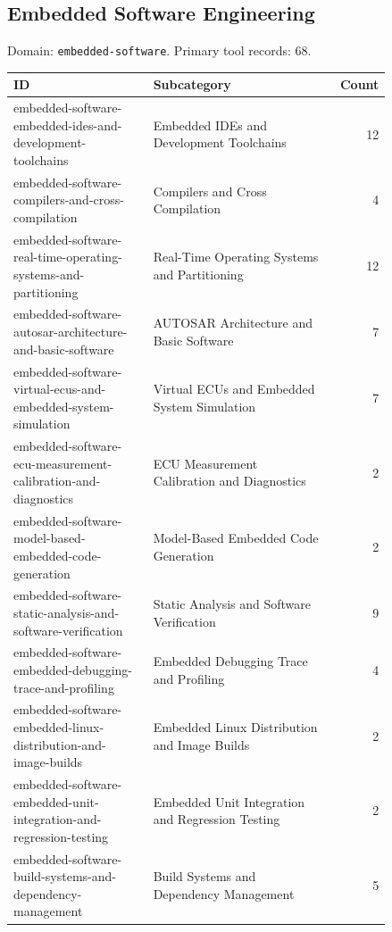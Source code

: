 \subsection{Embedded Software Engineering}
\noindent Domain: \texttt{embedded-software}. Primary tool records: 68.
\begin{longtable}{p{0.37\linewidth}p{0.47\linewidth}r}
ID & Subcategory & Count\\\hline\endhead
embedded-software-embedded-ides-and-development-toolchains & Embedded IDEs and Development Toolchains & 12\\
embedded-software-compilers-and-cross-compilation & Compilers and Cross Compilation & 4\\
embedded-software-real-time-operating-systems-and-partitioning & Real-Time Operating Systems and Partitioning & 12\\
embedded-software-autosar-architecture-and-basic-software & AUTOSAR Architecture and Basic Software & 7\\
embedded-software-virtual-ecus-and-embedded-system-simulation & Virtual ECUs and Embedded System Simulation & 7\\
embedded-software-ecu-measurement-calibration-and-diagnostics & ECU Measurement Calibration and Diagnostics & 2\\
embedded-software-model-based-embedded-code-generation & Model-Based Embedded Code Generation & 2\\
embedded-software-static-analysis-and-software-verification & Static Analysis and Software Verification & 9\\
embedded-software-embedded-debugging-trace-and-profiling & Embedded Debugging Trace and Profiling & 4\\
embedded-software-embedded-linux-distribution-and-image-builds & Embedded Linux Distribution and Image Builds & 2\\
embedded-software-embedded-unit-integration-and-regression-testing & Embedded Unit Integration and Regression Testing & 2\\
embedded-software-build-systems-and-dependency-management & Build Systems and Dependency Management & 5\\
\end{longtable}
